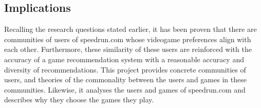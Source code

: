 \subsection{Implications}

Recalling the research questions stated earlier, it has been proven that there are communities of users of speedrun.com whose videogame preferences align with each other. Furthermore, these similarity of these users are reinforced with the accuracy of a game recommendation system with a reasonable accuracy and diversity of recommendations. This project provides concrete communities of users, and theories of the commonality between the users and games in these communities. Likewise, it analyses the users and games of speedrun.com and describes why they choose the games they play.